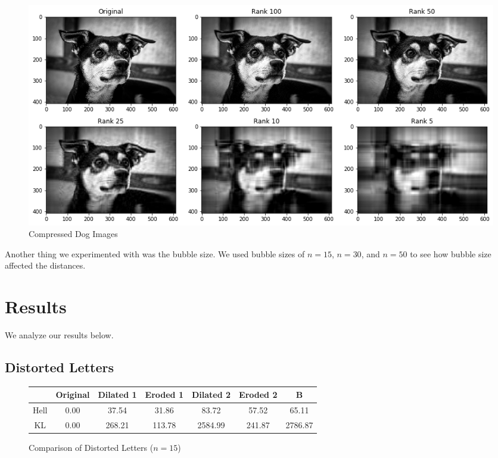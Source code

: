 \documentclass{article}
\begin{document}
\begin{figure}[h!]
\begin{center}
\includegraphics[width=\textwidth]{dogs.png}
\caption{Compressed Dog Images}
\label{fig:doggos}
\end{center}
\end{figure}

Another thing we experimented with was the bubble size. We used bubble sizes of $n=15$, $n=30$, and $n=50$ to see how bubble size affected the distances.

\section{Results}

We analyze our results below.

\subsection{Distorted Letters}

\begin{figure}[h!]
\begin{center}
\begin{tabular}{ c || c | c | c | c | c | c }
    & Original & Dilated 1 & Eroded 1 & Dilated 2 & Eroded 2 & B \\ \hline
    Hell & 0.00 & 37.54 & 31.86 & 83.72 & 57.52 & 65.11 \\
    KL & 0.00 & 268.21 & 113.78 & 2584.99 & 241.87 & 2786.87
\end{tabular}
\caption{Comparison of Distorted Letters ($n=15$)}
\label{fig:a15}
\end{center}
\end{figure}
\end{document}
